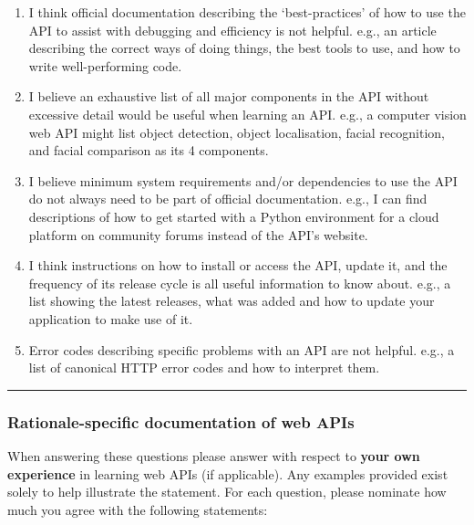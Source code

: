 \begin{enumerate}[label=Q3\alph*.,leftmargin=2\parindent]
\item  I think official documentation describing the ‘best-practices’ of how to use the API to assist with debugging and efficiency is not helpful. 
   e.g., an article describing the correct ways of doing things, the best tools to use, and how to write well-performing code.   
\item  I believe an exhaustive list of all major components in the API without excessive detail would be useful when learning an API. 
   e.g., a computer vision web API might list object detection, object localisation, facial recognition, and facial comparison as its 4 components.   
\item  I believe minimum system requirements and/or dependencies to use the API do not always need to be part of official documentation. 
   e.g., I can find descriptions of how to get started with a Python environment for a cloud platform on community forums instead of the API's website.   
\item  I think instructions on how to install or access the API, update it, and the frequency of its release cycle is all useful information to know about. 
   e.g., a list showing the latest releases, what was added and how to update your application to make use of it.   
\item  Error codes describing specific problems with an API are not helpful. 
   e.g., a list of canonical HTTP error codes and how to interpret them.   
\end{enumerate}

\bigskip\hrule
\subsubsection*{Rationale-specific documentation of web APIs}\noindent
When answering these questions please answer with respect to \textbf{your own experience} in learning web APIs (if applicable). Any examples provided exist solely to help illustrate the statement. For each question, please nominate how much you agree with the following statements: \AgreementScale

